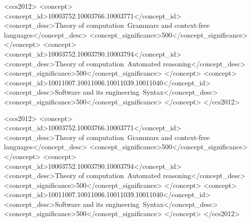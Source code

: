 \documentclass[sigplan,10pt,anonymous,review]{acmart}\settopmatter{printfolios=true,printccs=false,printacmref=false}
\begin{document}
\begin{CCSXML}
<ccs2012>
<concept>
<concept_id>10003752.10003766.10003771</concept_id>
<concept_desc>Theory of computation~Grammars and context-free languages</concept_desc>
<concept_significance>500</concept_significance>
</concept>
<concept>
<concept_id>10003752.10003790.10003794</concept_id>
<concept_desc>Theory of computation~Automated reasoning</concept_desc>
<concept_significance>500</concept_significance>
</concept>
<concept>
<concept_id>10011007.10011006.10011039.10011040</concept_id>
<concept_desc>Software and its engineering~Syntax</concept_desc>
<concept_significance>500</concept_significance>
</concept>
</ccs2012>

\begin{CCSXML}
<ccs2012>
<concept>
<concept_id>10003752.10003766.10003771</concept_id>
<concept_desc>Theory of computation~Grammars and context-free languages</concept_desc>
<concept_significance>500</concept_significance>
</concept>
<concept>
<concept_id>10003752.10003790.10003794</concept_id>
<concept_desc>Theory of computation~Automated reasoning</concept_desc>
<concept_significance>500</concept_significance>
</concept>
<concept>
<concept_id>10011007.10011006.10011039.10011040</concept_id>
<concept_desc>Software and its engineering~Syntax</concept_desc>
<concept_significance>500</concept_significance>
</concept>
</ccs2012>
\end{CCSXML}




\maketitle



\end{CCSXML}
\end{document}
